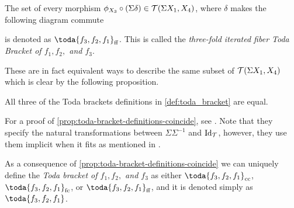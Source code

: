 \begin{definition}
\begin{enumerate}
{            The set of every morphism \( \phi_{X_3} \circ (\Sigma \delta) \in {\mathcal{T}}(\Sigma X_1, X_4) \), where \( \delta \) makes the following diagram commute
            \begin{center}
            \end{center}
            is denoted as \( \toda{f_3, f_2, f_1}_{\ff} \). This is called the \emph{three-fold iterated fiber Toda Bracket of \( f_1, f_2, \) and \( f_3 \)}.
        }
    \end{enumerate}
\end{definition}

These are in fact equivalent ways to describe the same subset of \( {\mathcal{T}}(\Sigma X_1, X_4) \) which is clear by the following proposition.

\begin{proposition}
    \label{prop:toda-bracket-definitions-coincide}
    All three of the Toda brackets definitions in \autoref{def:toda_bracket} are equal.
\end{proposition}

For a proof of \autoref{prop:toda-bracket-definitions-coincide}, see \cite[Proposition 3.3]{Christensen-Frankland_2017}. Note that they specify the natural transformations between \( \Sigma \Sigma^{-1} \) and \( \operatorname{Id}_{{\mathcal{T}}} \), however, they use them implicit when it fits as mentioned in \cite[p.\ 2690]{Christensen-Frankland_2017}.

As a consequence of \autoref{prop:toda-bracket-definitions-coincide} we can uniquely define the \emph{Toda bracket of \( f_1, f_2, \) and \( f_3 \)} as either \( \toda{f_3, f_2, f_1}_{\cc} \), \( \toda{f_3, f_2, f_1}_{\fc} \), or \( \toda{f_3, f_2, f_1}_{\ff} \), and it is denoted simply as \emph{\( \toda{f_3, f_2, f_1} \)}.

